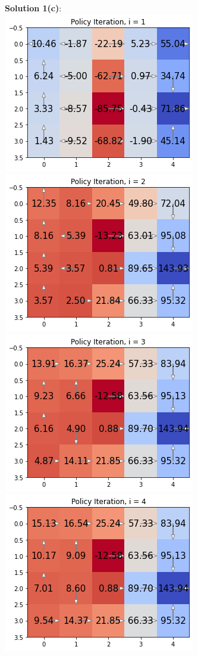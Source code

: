\documentclass[submit]{harvardml}
\begin{document}
\textbf{Solution 1(c)}:\\
\includegraphics[width=0.5\linewidth]{HW6/plots/1c.1.png}
\includegraphics[width=0.5\linewidth]{HW6/plots/1c.2.png}
\includegraphics[width=0.5\linewidth]{HW6/plots/1c.3.png}
\includegraphics[width=0.5\linewidth]{HW6/plots/1c.4.png}
\newpage
\end{document}
